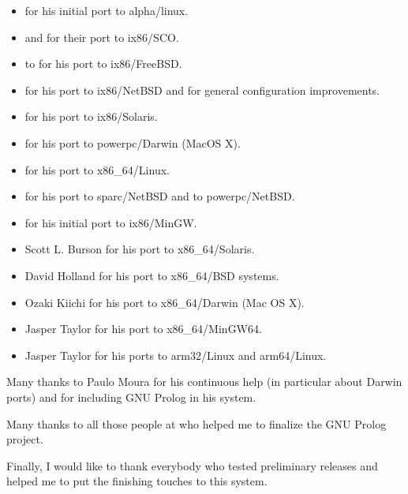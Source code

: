 \begin{itemize}

\item {} for his initial port to
alpha/linux.

\item {} and
 for their port to
ix86/SCO.

\item {} to for his port to
ix86/FreeBSD.

\item {} for his port to
ix86/NetBSD and for general configuration improvements.

\item {} for
his port to ix86/Solaris.

\item {} for his port to
powerpc/Darwin (MacOS X).

\item {} for his port to
x86\_64/Linux.

\item {} for his port to
sparc/NetBSD and to powerpc/NetBSD.

\item {} for his initial port to
ix86/MinGW.

\item {} {Scott L. Burson} for his port to x86\_64/Solaris.

\item {} {David Holland} for his port to x86\_64/BSD systems.

\item {} {Ozaki Kiichi} for his port to x86\_64/Darwin (Mac OS X).

\item {} {Jasper Taylor} for his port to x86\_64/MinGW64.

\item {} {Jasper Taylor} for his ports to arm32/Linux and arm64/Linux.

\end{itemize}

Many thanks to Paulo Moura for his continuous help (in particular about
Darwin ports) and for including GNU Prolog in his
 system.

Many thanks to all those people at  who helped
me to finalize the GNU Prolog project.

Finally, I would like to thank everybody who tested preliminary releases and
helped me to put the finishing touches to this system.


